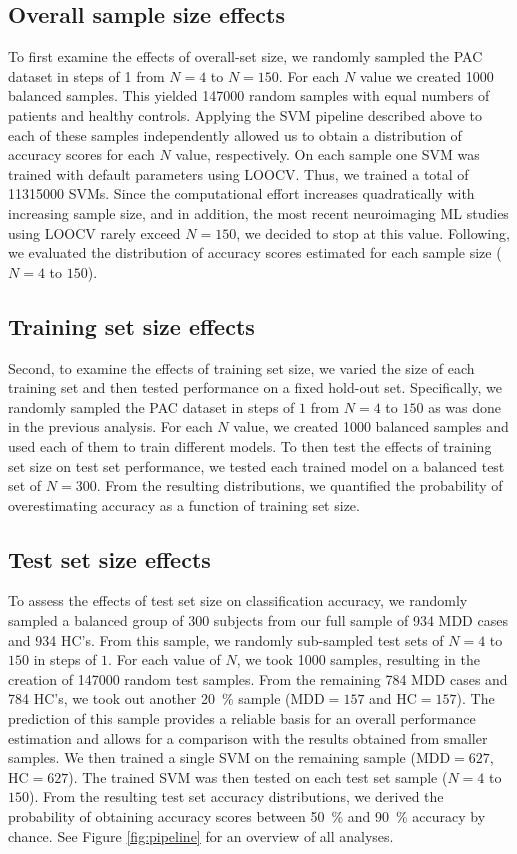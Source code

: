 \documentclass{article}
\begin{document}
    \subsection{Overall sample size effects}
    To first examine the effects of overall-set size, we randomly sampled the PAC dataset in steps of \num{1} from $N=4$ to $N=150$. For each $N$ value we created \num{1000} balanced samples. This yielded \num{147000} random samples with equal numbers of patients and healthy controls. Applying the SVM pipeline described above to each of these samples independently allowed us to obtain a distribution of accuracy scores for each $N$ value, respectively. On each sample one SVM was trained with default parameters using LOOCV. Thus, we trained a total of \num{11315000} SVMs. Since the computational effort increases quadratically with increasing sample size, and in addition, the most recent neuroimaging ML studies using LOOCV rarely exceed $N=150$, we decided to stop at this value. Following, we evaluated the distribution of accuracy scores estimated for each sample size ($N=4$ to $150$).

    \subsection{Training set size effects}
    Second, to examine the effects of training set size, we varied the size of each training set and then tested performance on a fixed hold-out set. Specifically, we randomly sampled the PAC dataset in steps of $1$ from $N=4$ to $150$ as was done in the previous analysis. For each $N$ value, we created \num{1000} balanced samples and used each of them to train different models. To then test the effects of training set size on test set performance, we tested each trained model on a balanced test set of $N=300$. From the resulting distributions, we quantified the probability of overestimating accuracy as a function of training set size.

    \subsection{Test set size effects}
    To assess the effects of test set size on classification accuracy, we randomly sampled a balanced group of \num{300} subjects from our full sample of \num{934} MDD cases and \num{934} HC’s. From this sample, we randomly sub-sampled test sets of $N=4$ to $150$ in steps of $1$. For each value of $N$, we took \num{1000} samples, resulting in the creation of \num{147000} random test samples. From the remaining \num{784} MDD cases and \num{784} HC’s, we took out another \SI{20}{\percent} sample ($\text{MDD}=157$ and $\text{HC}=157$). The prediction of this sample provides a reliable basis for an overall performance estimation and allows for a comparison with the results obtained from smaller samples. We then trained a single SVM on the remaining sample ($\text{MDD}=627$, $\text{HC}=627$). The trained SVM was then tested on each test set sample ($N=4$ to $150$). From the resulting test set accuracy distributions, we derived the probability of obtaining accuracy scores between \SI{50}{\percent} and \SI{90}{\percent} accuracy by chance. See Figure \ref{fig:pipeline} for an overview of all analyses.
\end{document}
